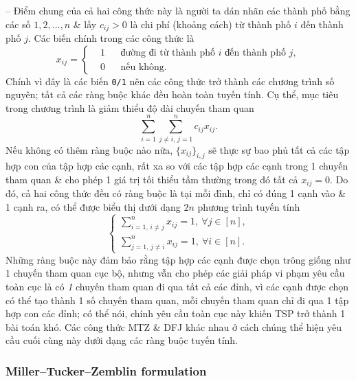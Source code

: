 \documentclass{article}
\begin{document}
-- Điểm chung của cả hai công thức này là người ta dán nhãn các thành phố bằng các số $1,2,\ldots,n$ \& lấy $c_{ij} > 0$ là chi phí (khoảng cách) từ thành phố $i$ đến thành phố $j$. Các biến chính trong các công thức là
\begin{equation*}
    x_{ij} = \left\{\begin{split}
        &1&&\mbox{đường đi từ thành phố } i\mbox{ đến thành phố } j,\\
        &0&&\mbox{nếu không}.
    \end{split}\right.
\end{equation*}
Chính vì đây là các biến {\tt0/1} nên các công thức trở thành các chương trình số nguyên; tất cả các ràng buộc khác đều hoàn toàn tuyến tính. Cụ thể, mục tiêu trong chương trình là giảm thiểu độ dài chuyến tham quan
\begin{equation*}
    \sum_{i=1}^n\sum_{j\ne i,\,j = 1}^n c_{ij}x_{ij}.
\end{equation*}
Nếu không có thêm ràng buộc nào nữa, $\{x_{ij}\}_{i,j}$ sẽ thực sự bao phủ tất cả các tập hợp con của tập hợp các cạnh, rất xa so với các tập hợp các cạnh trong 1 chuyến tham quan \& cho phép 1 giá trị tối thiểu tầm thường trong đó tất cả $x_{ij} = 0$. Do đó, cả hai công thức đều có ràng buộc là tại mỗi đỉnh, chỉ có đúng 1 cạnh vào \& 1 cạnh ra, có thể được biểu thị dưới dạng $2n$ phương trình tuyến tính
\begin{equation*}
    \left\{\begin{split}
        \sum_{i=1,\,i\ne j}^n x_{ij} = 1,\ \forall j\in[n],\\
        \sum_{j=1,\,j\ne i}^n x_{ij} = 1,\ \forall i\in[n].
    \end{split}\right.
\end{equation*}
Những ràng buộc này đảm bảo rằng tập hợp các cạnh được chọn trông giống như 1 chuyến tham quan cục bộ, nhưng vẫn cho phép các giải pháp vi phạm yêu cầu toàn cục là có {\it1} chuyến tham quan đi qua tất cả các đỉnh, vì các cạnh được chọn có thể tạo thành 1 số chuyến tham quan, mỗi chuyến tham quan chỉ đi qua 1 tập hợp con các đỉnh; có thể nói, chính yêu cầu toàn cục này khiến TSP trở thành 1 bài toán khó. Các công thức MTZ \& DFJ khác nhau ở cách chúng thể hiện yêu cầu cuối cùng này dưới dạng các ràng buộc tuyến tính.


\subsubsection{Miller--Tucker--Zemblin formulation}
\end{document}
